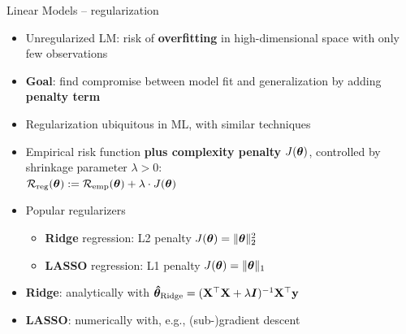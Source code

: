 \begin{frame}{Linear Models -- regularization}


\begin{itemize}
  \item Unregularized LM: risk of \textbf{overfitting} in high-dimensional 
  space with only few observations
  \item \textbf{Goal}: find compromise between model fit and generalization by 
  adding \textbf{penalty term}
  \item Regularization ubiquitous in ML, with similar techniques
\end{itemize}

\medskip




\medskip


\begin{itemize}
  \item Empirical risk function \textbf{plus complexity penalty} 
  $J(\bm{\theta})$, controlled by shrinkage parameter $\lambda > 0$: \\
  $\mathcal{R}_{\text{reg}}(\bm{\theta}) := \mathcal{R}_{\text{emp}}(\bm{\theta}) + \lambda \cdot J(\bm{\theta})$ 
  \item Popular regularizers
  \begin{itemize} 
    \item \textbf{Ridge} regression: L2 penalty $J(\bm{\theta}) = \|\bm{\theta}\|_2^2 $
    \item \textbf{LASSO} regression: L1 penalty $J(\bm{\theta}) = \|\bm{\theta}\|_1 $
  \end{itemize}
\end{itemize}

\medskip

\begin{itemize}
  \item \textbf{Ridge}: analytically with 
  $\bm{\hat\theta}_{\text{Ridge}} = (\mathbf{X}^\top \mathbf{X}  + \lambda \boldsymbol{I})^{-1} \mathbf{X}^\top 
  \mathbf{y}$
  \item \textbf{LASSO}: numerically with, e.g., (sub-)gradient descent
\end{itemize}

\end{frame}

